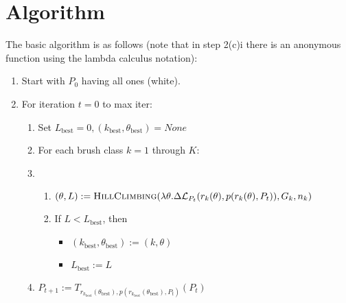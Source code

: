 \documentclass[12pt]{article}
\begin{document}
\section{Algorithm}
The basic algorithm is as follows (note that in step 2(c)i there is an anonymous function using the lambda calculus notation):
\begin{enumerate}
	\item Start with $P_0$ having all ones (white).
	\item For iteration $t=0$ to max iter:
	\begin{enumerate}
		\item Set $L_{\text{best}} = 0, (k_{\text{best}}, \theta_{\text{best}}) = None$
		\item For each brush class $k=1$ through $K$:
		\item \begin{enumerate}
			\item $(\theta, L) := \textsc{HillClimbing}(\lambda \theta . \Delta \mathcal{L}_{P_t}(r_k(\theta), p(r_k(\theta), P_t)), G_k, n_k)$
			\item If $L < L_{\text{best}}$, then
			\begin{itemize}
				\item $(k_\text{best},\theta_\text{best}) := (k, \theta)$
				\item $L_\text{best} := L$
			\end{itemize}
		\end{enumerate}
		\item $P_{t+1} := T_{r_{k_\text{best}}(\theta_\text{best}),p(r_{k_\text{best}}(\theta_\text{best}),P_t)}(P_t)$
	\end{enumerate}
\end{enumerate}
\end{document}
